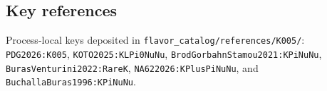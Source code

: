 \subsection*{Key references}
Process-local keys deposited in \texttt{flavor\_catalog/references/K005/}:
\texttt{PDG2026:K005}, \texttt{KOTO2025:KLPi0NuNu},
\texttt{BrodGorbahnStamou2021:KPiNuNu},
\texttt{BurasVenturini2022:RareK}, \texttt{NA622026:KPlusPiNuNu}, and
\texttt{BuchallaBuras1996:KPiNuNu}.
